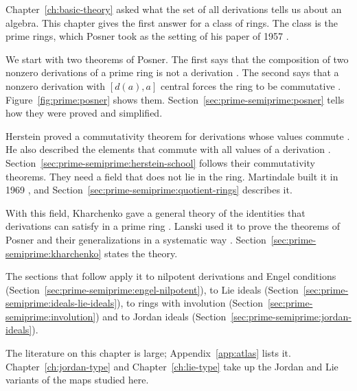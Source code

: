 
Chapter~\ref{ch:basic-theory} asked what the set of all derivations tells us about
an algebra. This chapter gives the first answer for a class of rings. The class is
the prime rings, which Posner took as the setting of his paper of 1957
\cite[p.~1093]{Posner1957}.

We start with two theorems of Posner. The first says that the composition
of two nonzero derivations of a prime ring is not a derivation
\cite[p.~1093]{Posner1957}. The second says that a nonzero derivation with
$[d(a),a]$ central forces the ring to be commutative
\cite[p.~1093]{Posner1957}. Figure~\ref{fig:prime:posner} shows them.
Section~\ref{sec:prime-semiprime:posner} tells how they were proved and
simplified.

Herstein proved a commutativity theorem for derivations whose values commute
\cite[Theorem~2, p.~369]{Herstein1978}. He also described the elements that
commute with all values of a derivation \cite[p.~509]{Herstein1979}. Section~\ref{sec:prime-semiprime:herstein-school}
follows their commutativity theorems. They need a field that does not lie in
the ring. Martindale built it in 1969 \cite[p.~576]{Martindale1969}, and
Section~\ref{sec:prime-semiprime:quotient-rings} describes it.

With this field, Kharchenko gave a general theory of the identities that
derivations can satisfy in a prime ring \cite[p.~155]{Kharchenko1978}.
Lanski used it to prove the theorems of Posner and their generalizations in a
systematic way \cite[p.~276]{Lanski1988}.
Section~\ref{sec:prime-semiprime:kharchenko} states the theory.

The sections that follow apply it to nilpotent derivations and Engel conditions
(Section~\ref{sec:prime-semiprime:engel-nilpotent}), to Lie ideals
(Section~\ref{sec:prime-semiprime:ideals-lie-ideals}), to rings with involution
(Section~\ref{sec:prime-semiprime:involution}) and to Jordan ideals
(Section~\ref{sec:prime-semiprime:jordan-ideals}).

The literature on this chapter is
large; Appendix~\ref{app:atlas} lists it. Chapter~\ref{ch:jordan-type} and
Chapter~\ref{ch:lie-type} take up the Jordan and Lie variants of the maps studied
here.


